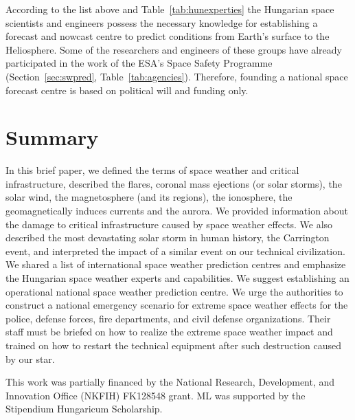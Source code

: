 \documentclass[sn-aps]{sn-jnl}%
\begin{document}
According to the list above and Table~\ref{tab:hunexperties} the Hungarian space scientists and engineers possess the necessary knowledge for establishing a forecast and nowcast centre to predict conditions from Earth's surface to the Heliosphere. Some of the researchers and engineers of these groups have already participated in the work of the ESA's Space Safety Programme (Section~\ref{sec:swpred}, Table~\ref{tab:agencies}). Therefore, founding a national space forecast centre is based on political will and funding only. 

\section{Summary}
\label{sec:sum}

In this brief paper, we defined the terms of space weather and critical infrastructure, described the flares, coronal mass ejections (or solar storms), the solar wind, the magnetosphere (and its regions), the ionosphere, the geomagnetically induces currents and the aurora. We provided information about the damage to critical infrastructure caused by space weather effects. We also described the most devastating solar storm in human history, the Carrington event, and interpreted the impact of a similar event on our technical civilization. We shared a list of international space weather prediction centres and emphasize the Hungarian space weather experts and capabilities. We suggest establishing an operational national space weather prediction centre. We urge the authorities to construct a national emergency scenario for extreme space weather effects for the police, defense forces, fire departments, and civil defense organizations. Their staff must be briefed on how to realize the extreme space weather impact and trained on how to restart the technical equipment after such destruction caused by our star. 

\backmatter


This work was partially financed by the National Research, Development, and Innovation Office (NKFIH) FK128548 grant. ML was supported by the Stipendium Hungaricum Scholarship. 

\vfill


\pagebreak

%

\end{document}
